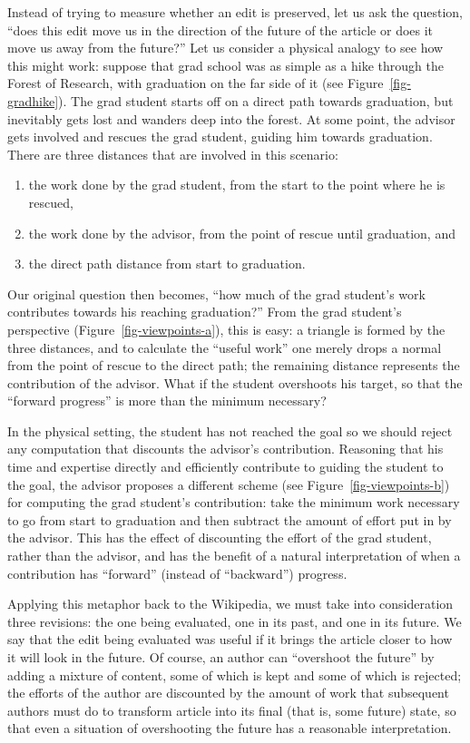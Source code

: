 Instead of trying to measure whether an edit is preserved,
let us ask the question, ``does this edit move us in the
direction of the future of the article or does it move us away
from the future?''
Let us consider a physical analogy to see how this might work:
suppose that grad school was as simple as a hike through the
Forest of Research, with graduation on the far side of it (see
Figure~\ref{fig-gradhike}).
The grad student starts off on a direct path towards graduation,
but inevitably gets lost and wanders deep into the forest.
At some point, the advisor gets involved and rescues the grad
student, guiding him towards graduation.
There are three distances that are involved in this scenario:
\begin{enumerate}
\item the work done by the grad student, from the start to
  the point where he is rescued,
\item the work done by the advisor, from the point of rescue
  until graduation, and
\item the direct path distance from start to graduation.
\end{enumerate}
Our original question then becomes, ``how much of the grad student's
work contributes towards his reaching graduation?''
From the grad student's perspective (Figure~\ref{fig-viewpoints-a}), this
is easy: a triangle is formed by the three distances, and to calculate
the ``useful work'' one merely drops a normal from the point of rescue
to the direct path; the remaining distance represents the contribution
of the advisor.
What if the student overshoots his target, so that the ``forward
progress'' is more than the minimum necessary?

In the physical setting, the student has not reached the goal so we
should reject any computation that discounts the advisor's contribution.
Reasoning that his time and expertise directly and efficiently
contribute to guiding the student to the goal, the advisor proposes a
different scheme (see Figure~\ref{fig-viewpoints-b}) for computing the
grad student's contribution: take the minimum work necessary to go from
start to graduation and then subtract the amount of effort put in by the
advisor.
This has the effect of discounting the effort of the grad student,
rather than the advisor, and has the benefit of a natural interpretation
of when a contribution has ``forward'' (instead of ``backward'') progress.


Applying this metaphor back to the Wikipedia, we must take into
consideration three revisions:
the one being evaluated, one in its past, and one in its future.
We say that the edit being evaluated was useful if it brings the article
closer to how it will look in the future.
Of course, an author can ``overshoot the future'' by adding a mixture of
content, some of which is kept and some of which is rejected; the
efforts of the author are discounted by the amount of work that
subsequent authors must do to transform article into its final (that is,
some future) state, so that even a situation of overshooting the future
has a reasonable interpretation.

